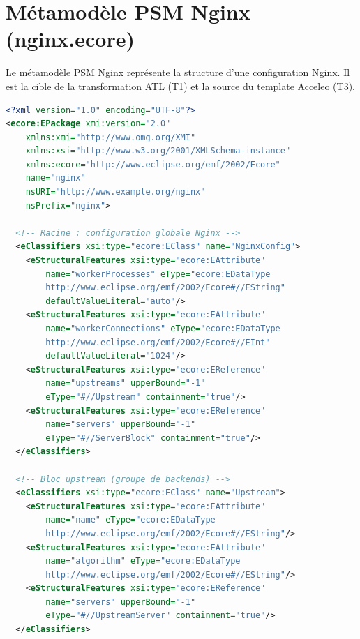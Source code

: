 \documentclass[12pt,a4paper]{report}
\begin{document}
\section{Métamodèle PSM Nginx (nginx.ecore)}

Le métamodèle PSM Nginx représente la structure d'une configuration Nginx. Il est la cible de la transformation ATL (T1) et la source du template Acceleo (T3).

\begin{lstlisting}[language=XML, caption={Métamodèle PSM Nginx (nginx.ecore)}]
<?xml version="1.0" encoding="UTF-8"?>
<ecore:EPackage xmi:version="2.0"
    xmlns:xmi="http://www.omg.org/XMI"
    xmlns:xsi="http://www.w3.org/2001/XMLSchema-instance"
    xmlns:ecore="http://www.eclipse.org/emf/2002/Ecore"
    name="nginx"
    nsURI="http://www.example.org/nginx"
    nsPrefix="nginx">

  <!-- Racine : configuration globale Nginx -->
  <eClassifiers xsi:type="ecore:EClass" name="NginxConfig">
    <eStructuralFeatures xsi:type="ecore:EAttribute"
        name="workerProcesses" eType="ecore:EDataType
        http://www.eclipse.org/emf/2002/Ecore#//EString"
        defaultValueLiteral="auto"/>
    <eStructuralFeatures xsi:type="ecore:EAttribute"
        name="workerConnections" eType="ecore:EDataType
        http://www.eclipse.org/emf/2002/Ecore#//EInt"
        defaultValueLiteral="1024"/>
    <eStructuralFeatures xsi:type="ecore:EReference"
        name="upstreams" upperBound="-1"
        eType="#//Upstream" containment="true"/>
    <eStructuralFeatures xsi:type="ecore:EReference"
        name="servers" upperBound="-1"
        eType="#//ServerBlock" containment="true"/>
  </eClassifiers>

  <!-- Bloc upstream (groupe de backends) -->
  <eClassifiers xsi:type="ecore:EClass" name="Upstream">
    <eStructuralFeatures xsi:type="ecore:EAttribute"
        name="name" eType="ecore:EDataType
        http://www.eclipse.org/emf/2002/Ecore#//EString"/>
    <eStructuralFeatures xsi:type="ecore:EAttribute"
        name="algorithm" eType="ecore:EDataType
        http://www.eclipse.org/emf/2002/Ecore#//EString"/>
    <eStructuralFeatures xsi:type="ecore:EReference"
        name="servers" upperBound="-1"
        eType="#//UpstreamServer" containment="true"/>
  </eClassifiers>


\end{lstlisting}
\end{document}
